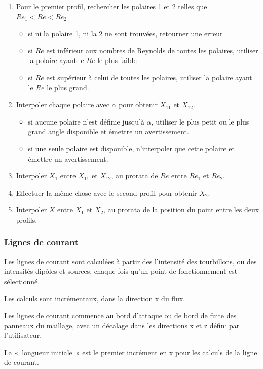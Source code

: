 \documentclass[a4paper,twoside,12pt,dvips]{article}
\begin{document}
\begin{enumerate}
	\item Pour le premier profil, rechercher les polaires 1 et 2 telles que
	$Re_1 < Re < Re_2$
	\begin{itemize}[label=]
		\item si ni la polaire 1, ni la 2 ne sont trouvées, retourner une erreur
		\item si $Re$ est inférieur aux nombres de Reynolds de toutes les 
		polaires, utiliser la polaire ayant le $Re$ le plus faible
		\item si $Re$ est supérieur à celui de toutes les polaires, utiliser la
		polaire ayant le $Re$ le plus grand. 
	\end{itemize}
	\item Interpoler chaque polaire avec $\alpha$ pour obtenir $X_{11}$ et
	$X_{12}$.

	\begin{itemize}[label=]
	    \item si aucune polaire n’est définie jusqu’à $\alpha$, utiliser le plus 
	    petit ou le plus grand angle disponible et émettre un avertissement.
	    \item si une seule polaire est disponible, n’interpoler que cette 
	    polaire et émettre un avertissement.
	\end{itemize}
	\item Interpoler $X_1$ entre $X_{11}$ et $X_{12}$, au prorata de $Re$ entre 
	$Re_1$ et $Re_2$.
	\item Effectuer la même chose avec le second profil pour obtenir $X_2$.
	\item Interpoler $X$ entre $X_1$ et $X_2$, au prorata de la position du 
	point entre les deux profils.
\end{enumerate}

\subsubsection{Lignes de courant}
Les lignes de courant sont calculées à partir des l’intensité des tourbillons, ou des intensités dipôles et sources, chaque fois qu’un point de fonctionnement
est sélectionné.

Les calculs sont incrémentaux, dans la direction x du flux.

Les lignes de courant commence au bord d’attaque ou de bord de fuite des panneaux du maillage, avec un décalage dans les directions x et z défini par l’utilisateur.

La «~longueur initiale~» est le premier incrément en x pour les calculs de la ligne de courant.
\end{document}
